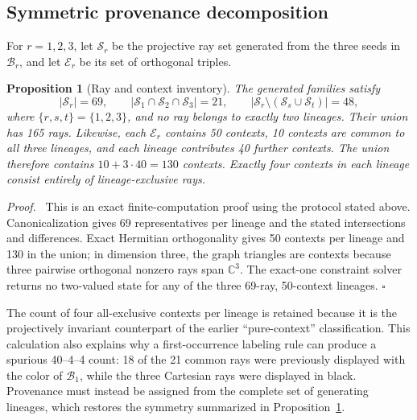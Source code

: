 \documentclass[%
  reprint,
  superscriptaddress,
  showpacs,
  showkeys,
  amsmath,amssymb,
  pra,
  longbibliography,
  floatfix,
  x11names
]{revtex4-2}
\newenvironment{revision}{\begingroup\color{revisionblue}}{\endgroup}
\newtheorem{proposition}{Proposition}
\newenvironment{proof}{\par\noindent\textit{Proof.}\ }{\hfill$\square$\par}
\begin{document}
\begin{revision}
\subsection{Symmetric provenance decomposition}

For $r=1,2,3$, let $\mathcal{S}_r$ be the projective ray set generated from the three seeds in $\mathcal{B}_r$, and let $\mathcal{E}_r$ be its set of orthogonal triples.

\begin{proposition}[Ray and context inventory]
\label{prop:provenance}
The generated families satisfy
\[
|\mathcal{S}_r|=69,\qquad
|\mathcal{S}_1\cap\mathcal{S}_2\cap\mathcal{S}_3|=21,
\qquad |\mathcal{S}_r\setminus(\mathcal{S}_s\cup\mathcal{S}_t)|=48,
\]
where $\{r,s,t\}=\{1,2,3\}$, and no ray belongs to exactly two lineages.  Their union has 165 rays.  Likewise, each $\mathcal{E}_r$ contains 50 contexts, 10 contexts are common to all three lineages, and each lineage contributes 40 further contexts.  The union therefore contains $10+3\cdot40=130$ contexts.  Exactly four contexts in each lineage consist entirely of lineage-exclusive rays.
\end{proposition}

\begin{proof}
This is an exact finite-computation proof using the protocol stated above.  Canonicalization gives 69 representatives per lineage and the stated intersections and differences.  Exact Hermitian orthogonality gives 50 contexts per lineage and 130 in the union; in dimension three, the graph triangles are contexts because three pairwise orthogonal nonzero rays span $\mathbb{C}^3$.  The exact-one constraint solver returns no two-valued state for any of the three 69-ray, 50-context lineages.
\end{proof}

The count of four all-exclusive contexts per lineage is retained because it is the projectively invariant counterpart of the earlier ``pure-context'' classification.  This calculation also explains why a first-occurrence labeling rule can produce a spurious 40--4--4 count: 18 of the 21 common rays were previously displayed with the color of $\mathcal{B}_1$, while the three Cartesian rays were displayed in black.  Provenance must instead be assigned from the complete set of generating lineages, which restores the symmetry summarized in Proposition~\ref{prop:provenance}.
\end{revision}
\end{document}
